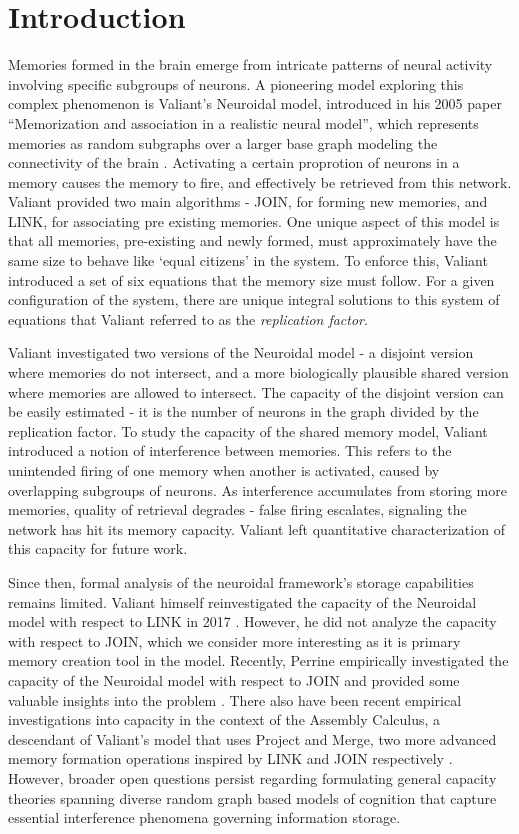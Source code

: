 \chapter{Introduction}

Memories formed in the brain emerge from intricate patterns of neural activity involving specific subgroups of neurons. A pioneering model exploring this complex phenomenon is Valiant's Neuroidal model, introduced in his 2005 paper ``Memorization and association in a realistic neural model'', which represents memories as random subgraphs over a larger base graph modeling the connectivity of the brain \cite{valiant2005memorization}. Activating a certain proprotion of neurons in a memory causes the memory to fire, and effectively be retrieved from this network. Valiant provided two main algorithms - JOIN, for forming new memories, and LINK, for associating pre existing memories. One unique aspect of this model is that all memories, pre-existing and newly formed, must approximately have the same size to behave like `equal citizens' in the system. To enforce this, Valiant introduced a set of six equations that the memory size must follow. For a given configuration of the system, there are unique integral solutions to this system of equations that Valiant referred to as the \textit{replication factor}. 

Valiant investigated two versions of the Neuroidal model - a disjoint version where memories do not intersect, and a more biologically plausible shared version where memories are allowed to intersect. The capacity of the disjoint version can be easily estimated - it is the number of neurons in the graph divided by the replication factor. To study the capacity of the shared memory model, Valiant introduced a notion of interference between memories. This refers to the unintended firing of one memory when another is activated, caused by overlapping subgroups of neurons. As interference accumulates from storing more memories, quality of retrieval degrades - false firing escalates, signaling the network has hit its memory capacity. Valiant left quantitative characterization of this capacity for future work.

Since then, formal analysis of the neuroidal framework's storage capabilities remains limited. Valiant himself reinvestigated the capacity of the Neuroidal model with respect to LINK in 2017 \cite{valiant2017capacity}. However, he did not analyze the capacity with respect to JOIN, which we consider more interesting as it is primary memory creation tool in the model. Recently, Perrine empirically investigated the capacity of the Neuroidal model with respect to JOIN and provided some valuable insights into the problem \cite{perrine2023neural}. There also have been recent empirical investigations into capacity in the context of the Assembly Calculus, a descendant of Valiant’s model that uses Project and Merge, two more advanced memory formation operations inspired by LINK and JOIN respectively \cite{xie2023skip}. However, broader open questions persist regarding formulating general capacity theories spanning diverse random graph based models of cognition that capture essential interference phenomena governing information storage.

